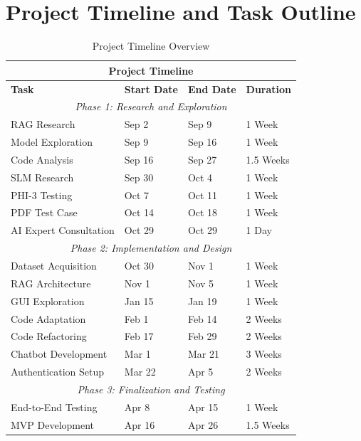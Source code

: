 \documentclass[12pt]{report}
\begin{document}
\section{Project Timeline and Task Outline}

\begin{table}[ht]
    \centering
    \label{tab:timeline}
    \begin{tabular}{|p{3.8cm}||p{2.8cm}|p{2.8cm}|p{2.8cm}|}
      \hline
      \multicolumn{4}{|c|}{\textbf{Project Timeline}} \\
      \hline
      \textbf{Task} & \textbf{Start Date} & \textbf{End Date} & \textbf{Duration} \\
      \hline
      \multicolumn{4}{|c|}{\textit{Phase 1: Research and Exploration}} \\
      \hline
      RAG Research & Sep 2 & Sep 9 & 1 Week \\
      Model Exploration & Sep 9 & Sep 16 & 1 Week \\
      Code Analysis & Sep 16 & Sep 27 & 1.5 Weeks \\
      SLM Research & Sep 30 & Oct 4 & 1 Week \\
      PHI-3 Testing & Oct 7 & Oct 11 & 1 Week \\
      PDF Test Case & Oct 14 & Oct 18 & 1 Week \\
      AI Expert Consultation & Oct 29 & Oct 29 & 1 Day \\
      \hline
      \multicolumn{4}{|c|}{\textit{Phase 2: Implementation and Design}} \\
      \hline
      Dataset Acquisition & Oct 30 & Nov 1 & 1 Week \\
      RAG Architecture & Nov 1 & Nov 5 & 1 Week \\
      GUI Exploration & Jan 15 & Jan 19 & 1 Week \\
      Code Adaptation & Feb 1 & Feb 14 & 2 Weeks \\
      Code Refactoring & Feb 17 & Feb 29 & 2 Weeks \\
      Chatbot Development & Mar 1 & Mar 21 & 3 Weeks \\
      Authentication Setup & Mar 22 & Apr 5 & 2 Weeks \\
      \hline
      \multicolumn{4}{|c|}{\textit{Phase 3: Finalization and Testing}} \\
      \hline
      End-to-End Testing & Apr 8 & Apr 15 & 1 Week \\
      MVP Development & Apr 16 & Apr 26 & 1.5 Weeks \\
      \hline
    \end{tabular}
    \caption{Project Timeline Overview}
\end{table}
    
\end{document}

